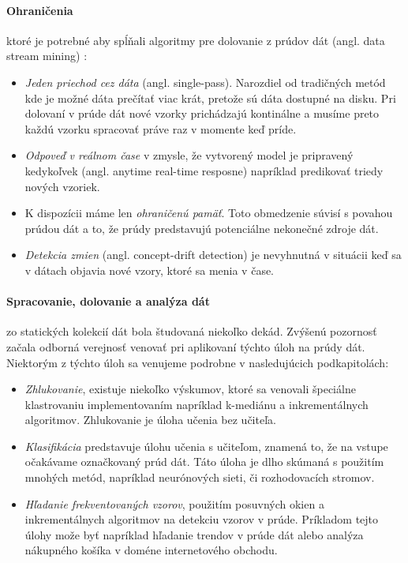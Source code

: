 \paragraph{Ohraničenia} ktoré je potrebné aby spĺňali algoritmy pre dolovanie z prúdov dát (angl. data stream mining) \citep{babcock2002models, nguyen2015survey, wadewale2015survey}:
\begin{itemize}
	\item \textit{Jeden priechod cez dáta} (angl. single-pass). Narozdiel od tradičných metód kde je možné dáta prečítať viac krát, pretože sú dáta dostupné na disku. Pri dolovaní v prúde dát nové vzorky prichádzajú kontinálne a musíme preto každú vzorku spracovať práve raz v momente keď príde.
	\item \textit{Odpoveď v reálnom čase} v zmysle, že vytvorený model je pripravený kedykoľvek (angl. anytime real-time resposne) napríklad predikovať triedy nových vzoriek.
	\item K dispozícii máme len \textit{ohraničenú pamäť}. Toto obmedzenie súvisí s povahou prúdou dát a to, že prúdy predstavujú potenciálne nekonečné zdroje dát.
	\item \textit{Detekcia zmien} (angl. concept-drift detection) je nevyhnutná v situácii keď sa v dátach objavia nové vzory, ktoré sa menia v čase.
\end{itemize}

\paragraph{Spracovanie, dolovanie a analýza dát} zo statických kolekcií dát bola študovaná niekoľko dekád. Zvýšenú pozornosť začala odborná verejnosť venovať pri aplikovaní týchto úloh na prúdy dát. Niektorým z týchto úloh sa venujeme podrobne v nasledujúcich podkapitolách:
\begin{itemize}
	\item \textit{Zhlukovanie}, existuje niekoľko výskumov, ktoré sa venovali špeciálne klastrovaniu implementovaním napríklad k-mediánu a inkrementálnych algoritmov. Zhlukovanie je úloha učenia bez učiteľa.
	\item \textit{Klasifikácia} predstavuje úlohu učenia s učiteľom, znamená to, že na vstupe očakávame označkovaný prúd dát. Táto úloha je dlho skúmaná s použitím mnohých metód, napríklad neurónových sieti, či rozhodovacích stromov.
	\item \textit{Hľadanie frekventovaných vzorov}, použitím posuvných okien a inkrementálnych algoritmov na detekciu vzorov v prúde. Príkladom tejto úlohy može byť napríklad hľadanie trendov v prúde dát alebo analýza nákupného košíka v doméne internetového obchodu.
\end{itemize}

